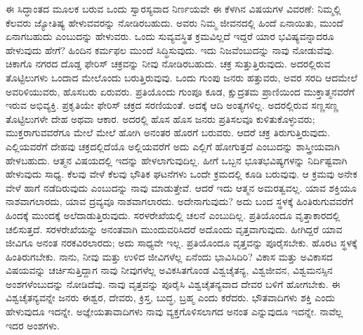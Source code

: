 \vskip 0.2cm

ಈ ಸಿದ್ಧಾಂತದ ಮೂಲಕ ಬರುವ ಒಂದು ಸ್ವಾರಸ್ಯವಾದ ನಿರ್ಣಯವೇ ಈ ಕೆಳಗಿನ ವಿಷಯಗಳ ವಿವರಣೆ: ನಿಮ್ಮಲ್ಲಿ ಕೆಲವರು ಜ್ಯೋತಿಷ್ಯ ಹೇಳುವವರನ್ನು ನೋಡಿರಬಹುದು. ಅವರು ನಿಮ್ಮ ಜೀವನದಲ್ಲಿ ಹಿಂದೆ ಏನಾಯಿತು, ಮುಂದೆ ಏನಾಗಬಹುದು ಎಂಬುದನ್ನು ಹೇಳುವರು. ಒಂದು ಸುವ್ಯವಸ್ಥಿತ ಕ್ರಮವಿಲ್ಲದೆ ಇದ್ದರೆ ಯಾರ ಭವಿಷ್ಯವನ್ನಾದರೂ ಹೇಳುವುದು ಹೇಗೆ? ಹಿಂದಿನ ಕರ್ಮಫಲ ಮುಂದೆ ಸಿದ್ಧಿಸುವುದು. ಇದು ನಿಜವೆಂಬುದನ್ನು ನಾವು ನೋಡುವೆವು. ಚಿಕಾಗೊ ನಗರದ ದೊಡ್ಡ ಫೇರಿಸ್​ ಚಕ್ರವನ್ನು ನೀವು ನೋಡಿರಬಹುದು. ಚಕ್ರ ಸುತ್ತುತ್ತಿರುವುದು. ಅದರಲ್ಲಿರುವ ತೊಟ್ಟಿಲುಗಳು ಒಂದಾದ ಮೇಲೊಂದು ಬರುತ್ತಿರುವುವು. ಒಂದು ಗುಂಪು ಜನರು ಹತ್ತುವರು, ಅವರ ಸರದಿ ಆದಮೇಲೆ ಅವರಿಳಿಯುವರು, ಹೊಸಬರು ಏರುವರು. ಪ್ರತಿಯೊಂದು ಗುಂಪೂ ಕೂಡ, ಕ್ಷುದ್ರತಮ ಪ್ರಾಣಿಯಿಂದ ಮುಕ್ತಾತ್ಮನವರೆಗೆ ಇರುವ ಅಭಿವ್ಯಕ್ತಿ. ಪ್ರಕೃತಿಯೇ ಫೇರಿಸ್​ ಚಕ್ರದ ಸರಣಿಯಂತೆ. ಅದಕ್ಕೆ ಆದಿ ಅಂತ್ಯಗಳಿಲ್ಲ. ಅದರಲ್ಲಿರುವ ಸಣ್ಣಸಣ್ಣ ತೊಟ್ಟಿಲುಗಳೇ ದೇಹ ಅಥವಾ ಆಕಾರ. ಅದರಲ್ಲಿ ಹೊಸ ಹೊಸ ಜನರು ಪ್ರತಿಸಲವೂ ಕುಳಿತುಕೊಳ್ಳುವರು; ಮುಕ್ತರಾಗುವವರೆಗೂ ಮೇಲೆ ಮೇಲೆ ಹೋಗಿ ಅನಂತರ ಹೊರಗೆ ಬರುವರು. ಆದರೆ ಚಕ್ರ ತಿರುಗುತ್ತಿರುವುದು. ಎಲ್ಲಿಯವರೆಗೆ ದೇಹವು ಚಕ್ರದಲ್ಲಿದೆಯೊ ಅಲ್ಲಿಯವರೆಗೆ ಅದು ಎಲ್ಲಿಗೆ ಹೋಗುತ್ತದೆ ಎಂಬುದನ್ನು ಶಾಸ್ತ್ರೀಯವಾಗಿ ಹೇಳಬಹುದು. ಆತ್ಮನ ವಿಷಯದಲ್ಲಿ ಇದನ್ನು ಹೇಳಲಾಗುವುದಿಲ್ಲ. ಹೀಗೆ ಒಬ್ಬನ ಭೂತಭವಿಷ್ಯಗಳನ್ನು ನಿರ್ದಿಷ್ಟವಾಗಿ ಹೇಳುವುದು ಸಾಧ್ಯ. ಕೆಲವು ವೇಳೆ ಕೆಲವು ಭೌತಿಕ ಘಟನೆಗಳು ಒಂದೇ ಕ್ರಮದಲ್ಲಿ ಕೂಡಿ ಬರುವುವು. ಆ ಕ್ರಮವು ಅನೇಕ ವೇಳೆ ಹಾಗೆ ನಡೆದಿರುವುದು ಎಂಬುದನ್ನು ನಾವು ಮಾಡುತ್ತೇವೆ. ಆದರೆ ಇದು ಆತ್ಮನ ಅಮರತ್ವವಲ್ಲ. ಯಾವ ಶಕ್ತಿಯೂ ನಾಶವಾಗಲಾರದು, ಯಾವ ದ್ರವ್ಯವೂ ನಾಶವಾಗಲಾರದು. ಅದೇನಾಗುವುದು? ಅದು ಬಂದ ಸ್ಥಳಕ್ಕೆ ಹಿಂತಿರುಗುವವರೆಗೆ ಹಿಂದಕ್ಕೆ ಮುಂದಕ್ಕೆ ಅಲೆದಾಡುತ್ತಿರುವುದು. ಸರಳರೇಖೆಯಲ್ಲಿ ಚಲನೆ ಎಂಬುದಿಲ್ಲ. ಪ್ರತಿಯೊಂದೂ ವೃತ್ತಾಕಾರದಲ್ಲಿ ಚಲಿಸುತ್ತದೆ. ಸರಳರೇಖೆಯನ್ನು ಅನಂತವಾಗಿ ಮುಂದುವರಿಸಿದರೆ ಅದೊಂದು ವೃತ್ತವಾಗುವುದು. ಹೀಗಿದ್ದರೆ ಯಾವ ಜೀವಿಗೂ ಅನಂತ ನರಕವಿರಲಾರದು; ಅದು ಸಾಧ್ಯವೇ ಇಲ್ಲ. ಪ್ರತಿಯೊಂದೂ ವೃತ್ತವನ್ನು ಪೂರೈಸಬೇಕು. ಹೊರಟ ಸ್ಥಳಕ್ಕೆ ಹಿಂತಿರುಗಬೇಕು. ನಾನು, ನೀವು ಮತ್ತು ಉಳಿದ ಜೀವಿಗಳೆಲ್ಲ ಏನೆಂದು ಭಾವಿಸಿದಿರಿ? ವಿಕಾಸ ಮತ್ತು ಅವಿಕಾಸದ ವಿಷಯವನ್ನು ಚರ್ಚಿಸುತ್ತಿದ್ದಾಗ ನಾವು ನೀವುಗಳೆಲ್ಲ ಅವಿಕಸಿತಗೊಂಡ ವಿಶ್ವಚೈತನ್ಯ, ವಿಶ್ವಜೀವನ, ವಿಶ್ವಮನಸ್ಸಿನ ಅಂಶಗಳೆಂಬುದನ್ನು ನೋಡಿದೆವು. ನಾವು ವೃತ್ತವನ್ನು ಪೂರೈಸಿ ವಿಶ್ವಚೈತನ್ಯವಾದ ದೇವರ ಬಳಿಗೆ ಹೋಗಬೇಕು. ಈ ವಿಶ್ವಚೈತನ್ಯವನ್ನೇ ಜನರು ಈಶ್ವರ, ದೇವರು, ಕ್ರಿಸ್ತ, ಬುದ್ಧ, ಬ್ರಹ್ಮ ಎಂದು ಕರೆದರು. ಭೌತವಾದಿಗಳು ಶಕ್ತಿ ಎಂದು ಹೇಳುವುದೂ ಇದನ್ನೇ. ಅಜ್ಞೇಯತಾವಾದಿಗಳು ನಾವು ವ್ಯಕ್ತಗೊಳಿಸಲಾಗದ ಅನಂತ ಎನ್ನುವುದೂ ಇದನ್ನೇ. ನಾವೆಲ್ಲ ಇದರ ಅಂಶಗಳು.

\vskip 0.2cm

